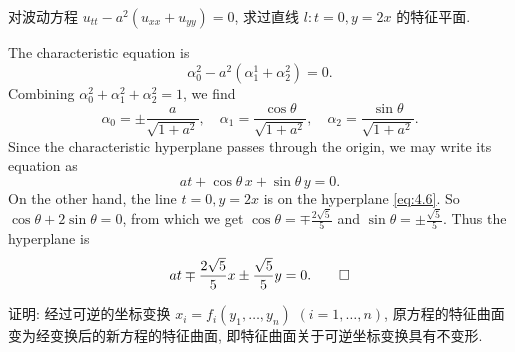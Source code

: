 \begin{exercise}
  对波动方程 $u_{tt} - a^2(u_{xx}+u_{yy}) = 0$, 求过直线 $l: t = 0, y = 2x$ 的特征平面.
\end{exercise}

\begin{solve}
  The characteristic equation is
  \[\alpha_0^2-a^2(\alpha_1^1+\alpha_2^2) = 0.\]
  Combining $\alpha_0^2+\alpha_1^2+\alpha_2^2=1$, we find
  \[\alpha_0 = \pm\frac{a}{\sqrt{1+a^2}},
    \quad \alpha_1=\frac{\cos\theta}{\sqrt{1+a^2}},
    \quad \alpha_2=\frac{\sin\theta}{\sqrt{1+a^2}}.\]
  Since the characteristic hyperplane passes through the origin,
  we may write its equation as
  \begin{equation}\label{eq:4.6}
    at + \cos\theta\, x + \sin\theta\, y = 0.
  \end{equation}
  On the other hand, the line $t=0, y=2x$ is on the hyperplane \eqref{eq:4.6}.
  So $\cos\theta+2\sin\theta = 0$, from which we get
  $\cos\theta = \mp\frac{2\sqrt{5}}{5}$ and $\sin\theta = \pm\frac{\sqrt{5}}{5}$.
  Thus the hyperplane is
  \[ at \mp \frac{2\sqrt{5}}{5}x \pm \frac{\sqrt{5}}{5}y = 0. \qedhere \]
\end{solve}


\begin{exercise}
  证明: 经过可逆的坐标变换 $x_i = f_i(y_1, \ldots, y_n)$ $(i=1, \ldots, n)$,
  原方程的特征曲面变为经变换后的新方程的特征曲面,
  即特征曲面关于可逆坐标变换具有不变形.
\end{exercise}

